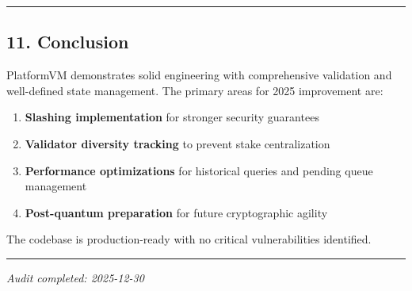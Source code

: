 \documentclass[
]{article}
\providecommand{\tightlist}{%
  \setlength{\itemsep}{0pt}\setlength{\parskip}{0pt}}
\begin{document}
\begin{center}\rule{0.5\linewidth}{0.5pt}\end{center}

\subsection{11. Conclusion}\label{11-conclusion}

PlatformVM demonstrates solid engineering with comprehensive validation
and well-defined state management. The primary areas for 2025
improvement are:

\begin{enumerate}
\def\labelenumi{\arabic{enumi}.}
\tightlist
\item
  \textbf{Slashing implementation} for stronger security guarantees
\item
  \textbf{Validator diversity tracking} to prevent stake centralization
\item
  \textbf{Performance optimizations} for historical queries and pending
  queue management
\item
  \textbf{Post-quantum preparation} for future cryptographic agility
\end{enumerate}

The codebase is production-ready with no critical vulnerabilities
identified.

\begin{center}\rule{0.5\linewidth}{0.5pt}\end{center}

\emph{Audit completed: 2025-12-30}
\end{document}
